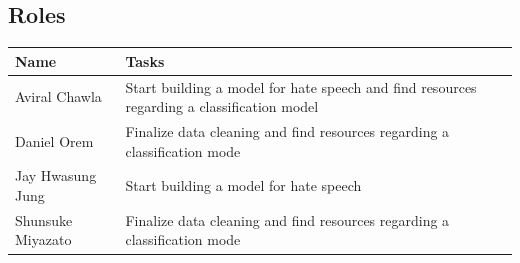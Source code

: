 \documentclass{article}
\begin{document}
\begin{multicols}{2}
    \subsection{Roles}
        \begin{tabular}{m{7.8em} | m{15em}} 
        \hline
        Name & Tasks \\ [0.5ex] 
        \hline\hline
        \small Aviral Chawla & Start building a model for hate speech and find resources regarding a classification model \\ 
        \hline
        \small Daniel Orem & Finalize data cleaning and find resources regarding a classification mode\\
        \hline
        \small Jay Hwasung Jung & Start building a model for hate speech \\
        \hline
        \small Shunsuke Miyazato &  Finalize data cleaning and find resources regarding a classification mode\\
        \end{tabular}
\end{multicols}
\end{document}
